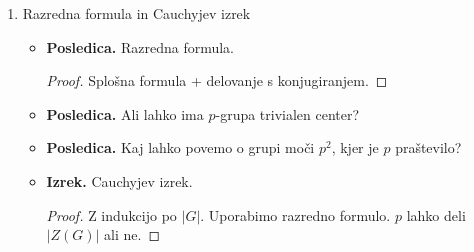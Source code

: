 \begin{enumerate}
    \item Razredna formula in Cauchyjev izrek
    \begin{itemize}
        \item \textbf{Posledica.} Razredna formula.
        \begin{proof}
            Splošna formula + delovanje s konjugiranjem.
        \end{proof}
        \item \textbf{Posledica.} Ali lahko ima \(p\)-grupa trivialen center?
        \item \textbf{Posledica.} Kaj lahko povemo o grupi moči \(p^2\), kjer je \(p\) praštevilo?
        \item \textbf{Izrek.} Cauchyjev izrek. \todo{*}
        \begin{proof}
            Z indukcijo po \(|G|\). Uporabimo razredno formulo. \(p\) lahko deli \(|Z(G)|\) ali ne.
        \end{proof}
    \end{itemize}
\end{enumerate}